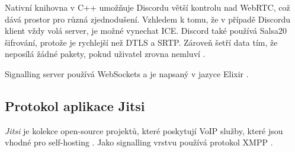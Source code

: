 Nativní knihovna v C++ umožňuje Discordu větší kontrolu nad WebRTC, což dává
prostor pro různá zjednodušení. Vzhledem k tomu, že v případě Discordu klient
vždy volá server, je možné vynechat ICE. Discord také používá Salsa20 šifrování,
protože je rychlejší než DTLS a SRTP. Zároveň šetří data tím, že neposílá žádné
pakety, pokud uživatel zrovna nemluví
\cite{Discord-HowDoesItHandleMillionsOfUsers}.

Signalling server používá WebSockets a je napsaný v jazyce Elixir
\cite{Discord-HowDoesItHandleMillionsOfUsers}.

\subsection{Protokol aplikace Jitsi}

\textit{Jitsi} je kolekce open-source projektů, které poskytují VoIP služby,
které jsou vhodné pro self-hosting \cite{Jitsi-Docs-Introduction}. Jako
signalling vrstvu používá protokol XMPP \cite{XMPPORG-WebRTC}.

